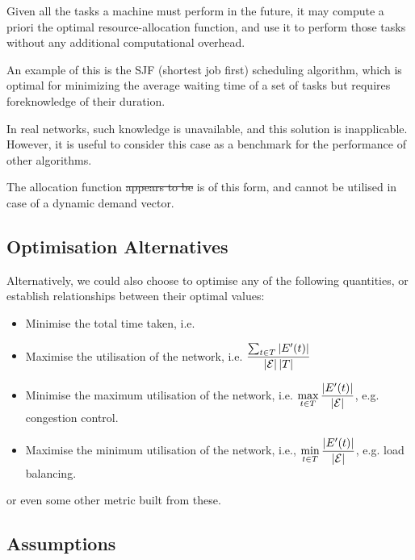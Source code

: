 \documentclass{amsart}
\begin{document}
    Given all the tasks a machine must perform in the future, it may compute a priori the optimal resource-allocation function, and use it to perform those tasks without any additional computational overhead. 
    
    An example of this is the SJF (shortest job first) scheduling algorithm, which is optimal for minimizing the average waiting time of a set of tasks but requires foreknowledge of their duration.

    In real networks, such knowledge is unavailable, and this solution is inapplicable. However, it is useful to consider this case as a benchmark for the performance of other algorithms.

    The allocation function \sout{appears to be} is of this form, and cannot be utilised in case of a dynamic demand vector.

    \subsection{Optimisation Alternatives}

    Alternatively, we could also choose to optimise any of the following quantities, or establish relationships between their optimal values: \begin{itemize}
        \item Minimise the total time taken, i.e. 
        \item Maximise the utilisation of the network, i.e. \(\displaystyle \frac{\sum_{t \in T} \left|E'(t)\right|}{\left|\mathcal{E}\right| \left|T\right|}\)
        \item Minimise the maximum utilisation of the network, i.e. \(\displaystyle \max_{t \in T} \frac{\left|E'(t)\right|}{\left|\mathcal{E}\right|}\), e.g. congestion control.
        \item Maximise the minimum utilisation of the network, i.e., \(\displaystyle \min_{t \in T} \frac{\left|E'(t)\right|}{\left|\mathcal{E}\right|}\), e.g. load balancing.
    \end{itemize}

    or even some other metric built from these.

    \subsection{Assumptions}
\end{document}
